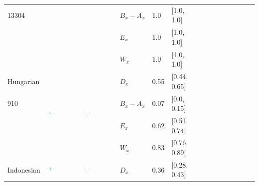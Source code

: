 \documentclass[11pt,letterpaper]{article}
\begin{document}
\begin{longtable}{lllllllllllllll}
13304  &    &    &  $B_x-A_x$  &  1.0  &  [1.0, 1.0]  \\ 
  &    &    &  $E_x$  &  1.0  &  [1.0, 1.0]  \\ 
  &    &    &  $W_x$  &  1.0  &  [1.0, 1.0]  \\ [10.25ex] \hline
Hungarian  &  \multirow{4}{*}{\includegraphics[width=0.25\textwidth]{figures/Hungarian-entropy-memory.pdf}}  &  \multirow{4}{*}{\includegraphics[width=0.25\textwidth]{figures/Hungarian-listener-surprisal-memory.pdf}}  &  $D_x$  &  0.55  &  [0.44, 0.65]  \\ 
910  &    &    &  $B_x-A_x$  &  0.07  &  [0.0, 0.15]  \\ 
  &    &    &  $E_x$  &  0.62  &  [0.51, 0.74]  \\ 
  &    &    &  $W_x$  &  0.83  &  [0.76, 0.89]  \\ [10.25ex] \hline
Indonesian  &  \multirow{4}{*}{\includegraphics[width=0.25\textwidth]{figures/Indonesian-entropy-memory.pdf}}  &  \multirow{4}{*}{\includegraphics[width=0.25\textwidth]{figures/Indonesian-listener-surprisal-memory.pdf}}  &  $D_x$  &  0.36  &  [0.28, 0.43]  \\ 

\end{longtable}
\end{document}
